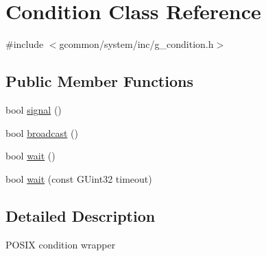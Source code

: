 \hypertarget{class_condition}{\section{Condition Class Reference}
\label{class_condition}
}


{\ttfamily \#include $<$gcommon/system/inc/g\-\_\-condition.\-h$>$}

\subsection*{Public Member Functions}
\begin{DoxyCompactItemize}
\item 
bool \hyperlink{class_condition_a99978f55fcc7ce22ff493c342a316f17}{signal} ()
\item 
bool \hyperlink{class_condition_a2ef7af4f232096d47fdee3770b551466}{broadcast} ()
\item 
bool \hyperlink{class_condition_a88c0022ac6c06d6ae19fcf0ae6b1fe5f}{wait} ()
\item 
bool \hyperlink{class_condition_a656bcfb272e325722553e0105f1486df}{wait} (const G\-Uint32 timeout)
\end{DoxyCompactItemize}


\subsection{Detailed Description}
P\-O\-S\-I\-X condition wrapper 

